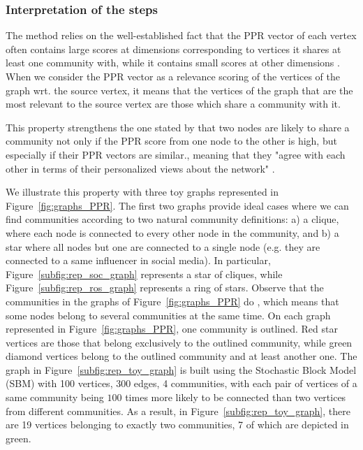 \subsubsection{Interpretation of the steps}\label{subsec:interpretation}


The \parfaite method relies on the well-established fact that the PPR vector of each vertex often contains large scores at dimensions corresponding to vertices it shares at least one community with, while it contains small scores at other dimensions \cite{Hollocou2017,Kloumann2014}. When we consider the PPR vector as a relevance scoring of the vertices of the graph wrt. the source vertex, it means that the vertices of the graph that are the most relevant to the source vertex are those which share a community with it.

This property strengthens the one stated by \cite{zhang_2020} that two nodes are likely to share a community not only if the PPR score from one node to the other is high, but especially if their PPR vectors are similar., meaning that they "agree with each other in terms of their personalized views about the network" \cite{zhang_2020}.


We illustrate this property with three toy graphs represented in Figure~\ref{fig:graphs_PPR}. The first two graphs provide ideal cases where we can find communities according to two natural community definitions: a) a clique, where each node is connected to every other node in the community,
and b) a star where all nodes but one are connected to a single node (e.g. they are connected to a same influencer in social media). In particular, Figure~\ref{subfig:rep_soc_graph} represents a star of cliques, while Figure~\ref{subfig:rep_ros_graph} represents a ring of stars. Observe that the communities in the graphs of Figure~\ref{fig:graphs_PPR} do , which means that some nodes belong to several communities at the same time. On each graph represented in Figure~\ref{fig:graphs_PPR}, one community is outlined. Red star vertices are those that belong exclusively to the outlined community, while green diamond vertices belong to the outlined community and at least another one. The graph in Figure~\ref{subfig:rep_toy_graph} is built using the Stochastic Block Model (SBM) with 100 vertices, 300 edges, 4 communities, with each pair of vertices of a same community being $100$ times more likely to be connected than two vertices from different communities. As a result, in Figure~\ref{subfig:rep_toy_graph}, there are 19 vertices belonging to exactly two communities, 7 of which are depicted in green. 

